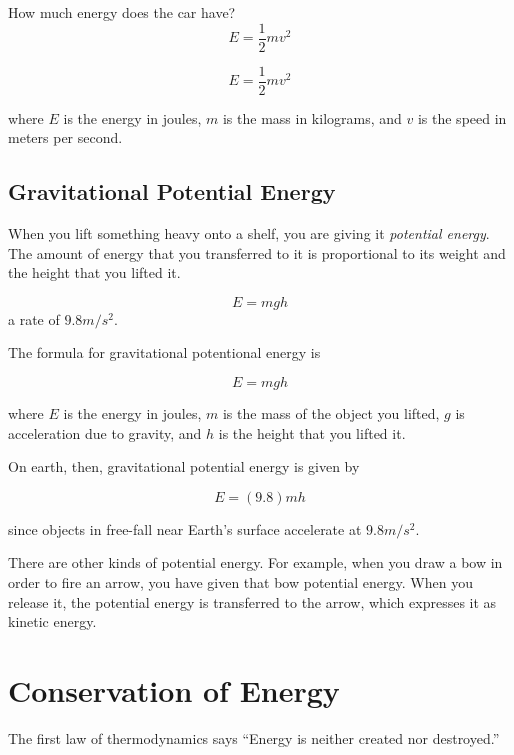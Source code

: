 How much energy does the car have?
\[
E = \frac{1}{2} m v^2
\]

\begin{mdframed}[style=important, frametitle={Formula for Kinetic Energy}]

\[
E = \frac{1}{2} m v^2
\]

where $E$ is the energy in joules, $m$ is the mass in kilograms, and
$v$ is the speed in meters per second.

\end{mdframed}

\subsection{Gravitational Potential Energy}


When you lift something heavy onto a shelf, you are giving it \textit{potential 
energy}. The amount of energy that you transferred to it is proportional to its 
weight and the height that you lifted it.

\[
E = mgh
\]
a rate of $9.8 m/s^2$.

\begin{mdframed}[style=important, frametitle={Formula for Gravitational Potential Energy}]
The formula for gravitational potentional energy is

\[
E = mgh
\]

where $E$ is the energy in joules, $m$ is the mass of the object you
lifted, $g$ is acceleration due to gravity, and $h$ is the height that you lifted it.

On earth, then, gravitational potential energy is given by

\[
E = (9.8)mh
\]

since objects in free-fall near Earth's surface accelerate at $9.8 m/s^2$.

\end{mdframed}


There are other kinds of potential energy. For example, when you draw a bow in 
order to fire an arrow, you have given that bow potential energy. When you release it,
the potential energy is transferred to the arrow, which expresses it as kinetic energy.

\section{Conservation of Energy}

The first law of thermodynamics says ``Energy is neither created nor destroyed.''

